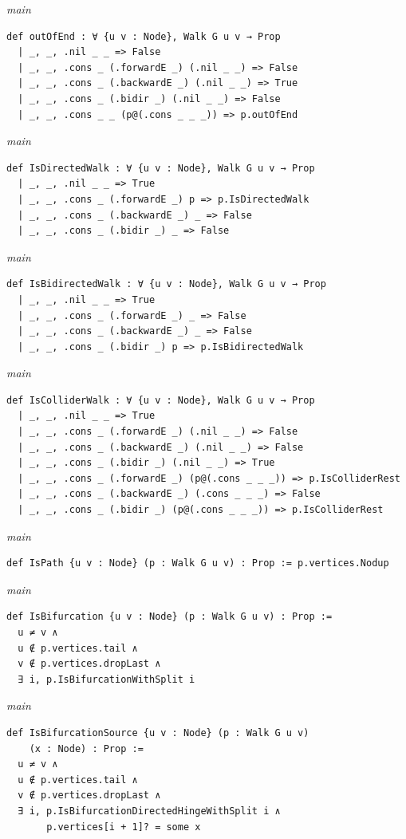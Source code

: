 {\small\textit{main}}
\begin{verbatim}
def outOfEnd : ∀ {u v : Node}, Walk G u v → Prop
  | _, _, .nil _ _ => False
  | _, _, .cons _ (.forwardE _) (.nil _ _) => False
  | _, _, .cons _ (.backwardE _) (.nil _ _) => True
  | _, _, .cons _ (.bidir _) (.nil _ _) => False
  | _, _, .cons _ _ (p@(.cons _ _ _)) => p.outOfEnd
\end{verbatim}
{\small\textit{main}}
\begin{verbatim}
def IsDirectedWalk : ∀ {u v : Node}, Walk G u v → Prop
  | _, _, .nil _ _ => True
  | _, _, .cons _ (.forwardE _) p => p.IsDirectedWalk
  | _, _, .cons _ (.backwardE _) _ => False
  | _, _, .cons _ (.bidir _) _ => False
\end{verbatim}
{\small\textit{main}}
\begin{verbatim}
def IsBidirectedWalk : ∀ {u v : Node}, Walk G u v → Prop
  | _, _, .nil _ _ => True
  | _, _, .cons _ (.forwardE _) _ => False
  | _, _, .cons _ (.backwardE _) _ => False
  | _, _, .cons _ (.bidir _) p => p.IsBidirectedWalk
\end{verbatim}
{\small\textit{main}}
\begin{verbatim}
def IsColliderWalk : ∀ {u v : Node}, Walk G u v → Prop
  | _, _, .nil _ _ => True
  | _, _, .cons _ (.forwardE _) (.nil _ _) => False
  | _, _, .cons _ (.backwardE _) (.nil _ _) => False
  | _, _, .cons _ (.bidir _) (.nil _ _) => True
  | _, _, .cons _ (.forwardE _) (p@(.cons _ _ _)) => p.IsColliderRest
  | _, _, .cons _ (.backwardE _) (.cons _ _ _) => False
  | _, _, .cons _ (.bidir _) (p@(.cons _ _ _)) => p.IsColliderRest
\end{verbatim}
{\small\textit{main}}
\begin{verbatim}
def IsPath {u v : Node} (p : Walk G u v) : Prop := p.vertices.Nodup
\end{verbatim}
{\small\textit{main}}
\begin{verbatim}
def IsBifurcation {u v : Node} (p : Walk G u v) : Prop :=
  u ≠ v ∧
  u ∉ p.vertices.tail ∧
  v ∉ p.vertices.dropLast ∧
  ∃ i, p.IsBifurcationWithSplit i
\end{verbatim}
{\small\textit{main}}
\begin{verbatim}
def IsBifurcationSource {u v : Node} (p : Walk G u v)
    (x : Node) : Prop :=
  u ≠ v ∧
  u ∉ p.vertices.tail ∧
  v ∉ p.vertices.dropLast ∧
  ∃ i, p.IsBifurcationDirectedHingeWithSplit i ∧
       p.vertices[i + 1]? = some x
\end{verbatim}
~%

